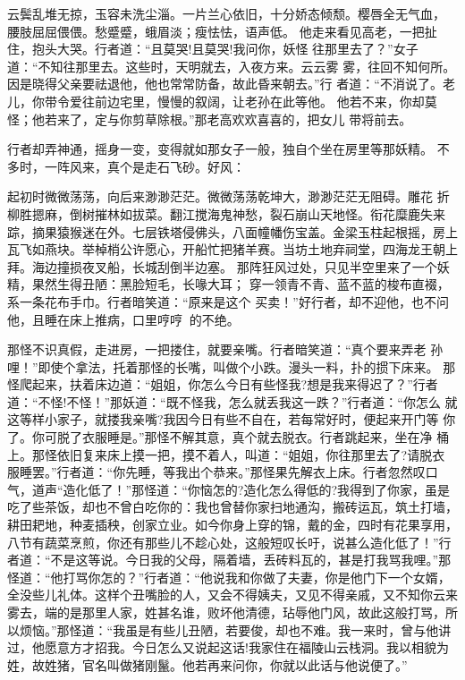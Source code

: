 云鬓乱堆无掠，玉容未洗尘淄。一片兰心依旧，十分娇态倾颓。樱唇全无气血，
腰肢屈屈偎偎。愁蹙蹙，蛾眉淡；瘦怯怯，语声低。
他走来看见高老，一把扯住，抱头大哭。行者道：“且莫哭!且莫哭!我问你，妖怪
往那里去了？”女子道：“不知往那里去。这些时，天明就去，入夜方来。云云雾
雾，往回不知何所。因是晓得父亲要祛退他，他也常常防备，故此昏来朝去。”行
者道：“不消说了。老儿，你带令爱往前边宅里，慢慢的叙阔，让老孙在此等他。
他若不来，你却莫怪；他若来了，定与你剪草除根。”那老高欢欢喜喜的，把女儿
带将前去。

行者却弄神通，摇身一变，变得就如那女子一般，独自个坐在房里等那妖精。
不多时，一阵风来，真个是走石飞砂。好风：

起初时微微荡荡，向后来渺渺茫茫。微微荡荡乾坤大，渺渺茫茫无阻碍。雕花
折柳胜摁麻，倒树摧林如拔菜。翻江搅海鬼神愁，裂石崩山天地怪。衔花糜鹿失来
踪，摘果猿猴迷在外。七层铁塔侵佛头，八面幢幡伤宝盖。金梁玉柱起根摇，房上
瓦飞如燕块。举棹梢公许愿心，开船忙把猪羊赛。当坊土地弃祠堂，四海龙王朝上
拜。海边撞损夜叉船，长城刮倒半边塞。
那阵狂风过处，只见半空里来了一个妖精，果然生得丑陋：黑脸短毛，长喙大耳；
穿一领青不青、蓝不蓝的梭布直裰，系一条花布手巾。行者暗笑道：“原来是这个
买卖！”好行者，却不迎他，也不问他，且睡在床上推病，口里哼哼的不绝。

那怪不识真假，走进房，一把搂住，就要亲嘴。行者暗笑道：“真个要来弄老
孙哩！”即使个拿法，托着那怪的长嘴，叫做个小跌。漫头一料，扑的掼下床来。
那怪爬起来，扶着床边道：“姐姐，你怎么今日有些怪我?想是我来得迟了？”行者
道：“不怪!不怪！”那妖道：“既不怪我，怎么就丢我这一跌？”行者道：“你怎么
就这等样小家子，就搂我亲嘴?我因今日有些不自在，若每常好时，便起来开门等
你了。你可脱了衣服睡是。”那怪不解其意，真个就去脱衣。行者跳起来，坐在净
桶上。那怪依旧复来床上摸一把，摸不着人，叫道：“姐姐，你往那里去了?请脱衣
服睡罢。”行者道：“你先睡，等我出个恭来。”那怪果先解衣上床。行者忽然叹口
气，道声“造化低了！”那怪道：“你恼怎的?造化怎么得低的?我得到了你家，虽是
吃了些茶饭，却也不曾白吃你的：我也曾替你家扫地通沟，搬砖运瓦，筑土打墙，
耕田耙地，种麦插秧，创家立业。如今你身上穿的锦，戴的金，四时有花果享用，
八节有蔬菜烹煎，你还有那些儿不趁心处，这般短叹长吁，说甚么造化低了！”行
者道：“不是这等说。今日我的父母，隔着墙，丢砖料瓦的，甚是打我骂我哩。”那
怪道：“他打骂你怎的？”行者道：“他说我和你做了夫妻，你是他门下一个女婿，
全没些儿礼体。这样个丑嘴脸的人，又会不得姨夫，又见不得亲戚，又不知你云来
雾去，端的是那里人家，姓甚名谁，败坏他清德，玷辱他门风，故此这般打骂，所
以烦恼。”那怪道：“我虽是有些儿丑陋，若要俊，却也不难。我一来时，曾与他讲
过，他愿意方才招我。今日怎么又说起这话!我家住在福陵山云栈洞。我以相貌为
姓，故姓猪，官名叫做猪刚鬣。他若再来问你，你就以此话与他说便了。”


